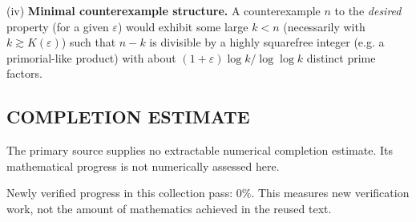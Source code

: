 (iv) \textbf{Minimal counterexample structure.}
A counterexample $n$ to the \emph{desired} property (for a given $\varepsilon$) would exhibit some large $k<n$ (necessarily with $k\gtrsim K(\varepsilon)$) such that $n-k$ is divisible by a highly squarefree integer (e.g. a primorial-like product) with about $(1+\varepsilon)\log k/\log\log k$ distinct prime factors.




\subsection*{COMPLETION ESTIMATE}
The primary source supplies no extractable numerical completion estimate. Its mathematical progress is not numerically assessed here.

Newly verified progress in this collection pass: $0\%$. This measures new verification work, not the amount of mathematics achieved in the reused text.

